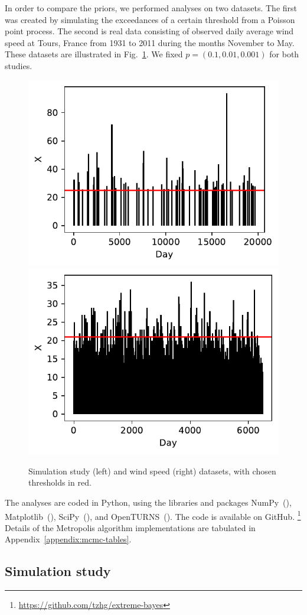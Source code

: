 \documentclass{article}
\begin{document}
%
In order to compare the priors, we performed analyses on two
datasets.
The first was created by simulating the exceedances of a certain threshold
from a Poisson point process.
The second is real data consisting of observed daily average wind speed at
Tours, France from 1931 to 2011 during the months November to May.
These datasets are illustrated in Fig.~\ref{fig:data}.
We fixed $p = (0.1, 0.01, 0.001)$ for both studies.
%
\begin{figure}
	\centering
	\includegraphics[width=0.49\linewidth]{plots/ppp-data.pdf}
	\includegraphics[width=0.49\linewidth]{plots/ws-data.pdf}
	\caption{Simulation study (left) and wind speed (right) datasets, with
		chosen thresholds in red.}
	\label{fig:data}
\end{figure}
%

%
The analyses are coded in Python, using the libraries and packages
NumPy~(\cite{numpy}), Matplotlib~(\cite{matplotlib}),
SciPy~(\cite{scipy}), and OpenTURNS~(\cite{OpenTURNS}).
The code is available on GitHub.
\footnote{\url{https://github.com/tzhg/extreme-bayes}}
Details of the Metropolis algorithm implementations
are tabulated in Appendix~\ref{appendix:mcmc-tables}.
%
\subsection{Simulation study}
%
\end{document}
